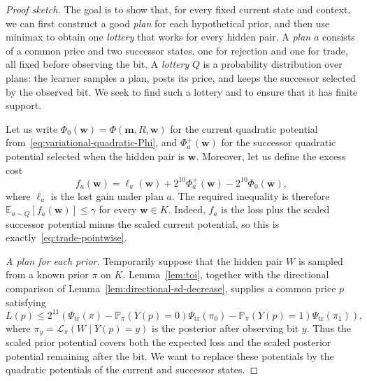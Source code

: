 \documentclass[11pt]{article}
\newcommand{\Esub}[2]{\mathbb E_{#1}\left[#2\right]}
\newcommand{\bm}{\boldsymbol m}
\begin{document}
\begin{proof}[Proof sketch] The goal is to show that, for every fixed current state and context, we can first construct a good \emph{plan} {for} each hypothetical prior, and then use minimax to obtain one \emph{lottery} that works for every hidden pair. A \emph{plan} $a$ consists of a common price and two successor states, one for rejection and one for trade, all fixed before observing the bit. A \emph{lottery} $Q$ is a probability distribution over {plans:} the learner samples a plan, posts its price, and keeps the successor selected by the observed bit. We seek to find such a lottery and to ensure that it has finite support.

Let us write $\Phi_0(\boldsymbol w)=\Phi(\bm,R,\boldsymbol w)$ for the current quadratic potential from~\eqref{eq:variational-quadratic-Phi}, and $\Phi_a^+(\boldsymbol w)$ for the successor quadratic potential selected when the hidden pair is $\boldsymbol w$. Moreover, let us define the excess cost
\[
    f_a(\boldsymbol w)=\ell_a(\boldsymbol w)+2^{10}\Phi_a^+(\boldsymbol w)-2^{10}\Phi_0(\boldsymbol w), \tag{Excess cost}
\]
where $\ell_a$ is the lost gain under plan $a$. The required inequality is therefore $\Esub{a\sim Q}{f_a(\boldsymbol w)}\le\gamma$ for every $\boldsymbol w\in K$. Indeed, $f_a$ is the loss plus the scaled successor potential minus the scaled current potential, so this is exactly~\eqref{eq:trade-pointwise}.

\emph{A plan for each prior.} Temporarily suppose that the hidden pair $W$ is sampled from a known prior $\pi$ on $K$. Lemma~\ref{lem:toi}, together with the directional comparison of Lemma~\ref{lem:directional-sd-decrease}, supplies a common price $p$ satisfying 
\[ L(p)\le2^{11}\left(\Psi_{\mathrm{tr}}(\pi)-\mathbb P_\pi(Y(p)=0)\Psi_{\mathrm{tr}}(\pi_0)-\mathbb P_\pi(Y(p)=1)\Psi_{\mathrm{tr}}(\pi_1)\right), \tag{Bayesian bound} \] where $\pi_y=\mathcal L_\pi(W\mid Y(p)=y)$ is the posterior after observing bit $y$.
Thus the scaled prior potential covers both the expected loss and the scaled posterior potential remaining after the bit. We want to replace these potentials by the quadratic potentials of the current and successor states.


\end{proof}
\end{document}
